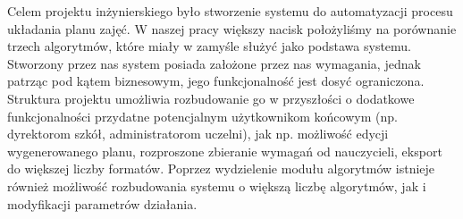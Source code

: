 \documentclass[11pt]{report}
\begin{document}
\par Celem projektu inżynierskiego było stworzenie systemu do automatyzacji procesu układania planu zajęć. W naszej pracy większy nacisk położyliśmy na porównanie trzech algorytmów, które miały w zamyśle służyć jako podstawa systemu. Stworzony przez nas system posiada założone przez nas wymagania, jednak patrząc pod kątem biznesowym, jego funkcjonalność jest dosyć ograniczona. Struktura projektu umożliwia rozbudowanie go w przyszłości o dodatkowe funkcjonalności przydatne potencjalnym użytkownikom końcowym (np. dyrektorom szkół, administratorom uczelni), jak np. możliwość edycji wygenerowanego planu, rozproszone zbieranie wymagań od nauczycieli, eksport do większej liczby formatów. Poprzez wydzielenie modułu algorytmów istnieje również możliwość rozbudowania systemu o większą liczbę algorytmów, jak i modyfikacji parametrów działania. 


\end{document}
